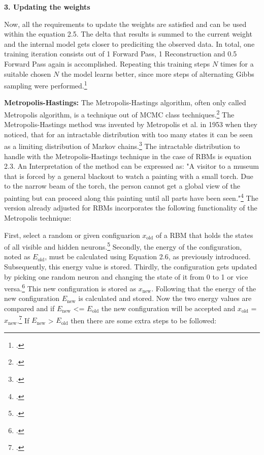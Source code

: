 \textbf{3. Updating the weights}

Now, all the requirements to update the weights are satisfied and can be used within the equation 2.5. 
The delta that results is summed to the current weight and the internal model gets closer to prediciting the observed data.
In total, one training iteration consists out of 1 Forward Pass, 1 Reconstruction and 0.5 Forward Pass again is accomplished.
Repeating this training steps \( N \) times for a suitable chosen \( N \) the model learns better, since more steps of alternating Gibbs sampling were performed.\footcite[cf.][6]{huembeliPhysicsEnergybasedModels2022}


\textbf{Metropolis-Hastings:} The Metropolis-Hastings algorithm, often only called Metropolis algorithm, is a technique out of \ac{MCMC} class techniques.\footcite[cf.][1]{patronOptimalRelaxationRate2024}
The Metropolis-Hastings method was invented by Metropolis et al. in 1953 when they noticed, that for an intractable distribution with too many states it can be seen as a limiting distribution of Markov chains.\footcite[cf.][1087-1092]{metropolisEquationStateCalculations1953} 
The intractable distribution to handle with the Metropolis-Hastings technique in the case of \ac{RBM}s is equation 2.3.
An Interpretation of the method can be expressed as: "A visitor to a museum that is forced by a general blackout to watch
a painting with a small torch.
Due to the narrow beam of the torch, the person cannot get a global view of the painting but can proceed along this painting until all parts have been seen."\footcite[cf.][2]{robertMetropolisHastingsAlgorithm2016}
The version already adjusted for \ac{RBM}s incorporates the following functionality of the Metropolis technique:

First, select a random or given configuarion $x_{\text{old}}$ of a \ac{RBM} that holds the states of all visible and hidden neurons.\footcite[cf.][65]{beichlMetropolisAlgorithm2000}
Secondly, the energy of the configuration, noted as  $E_{\text{old}}$, must be calculated using Equation 2.6, as previously introduced. Subsequently, this energy value is stored.
Thirdly, the configuration gets updated by picking one random neuron and changing the state of it from 0 to 1 or vice versa.\footcite[cf.][1]{rosenthalOptimalProposalDistributions2009}
This new configuration is stored as $x_{\text{new}}$. Following that the energy of the new configuration $E_{\text{new}}$ is calculated and stored.
Now the two energy values are compared and if $E_{\text{new}}$ <= $E_{\text{old}}$ the new configuration will be accepted and $x_{\text{old}}$ = $x_{\text{new}}$.\footcite[cf.][1-2]{patronOptimalRelaxationRate2024}
If $E_{\text{new}}$ > $E_{\text{old}}$ then there are some extra steps to be followed: 

